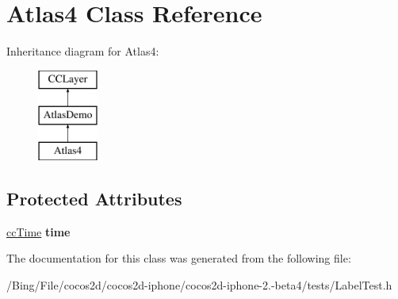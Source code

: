 \hypertarget{interface_atlas4}{\section{Atlas4 Class Reference}
\label{interface_atlas4}
}
Inheritance diagram for Atlas4\-:\begin{figure}[H]
\begin{center}
\leavevmode
\includegraphics[height=3.000000cm]{interface_atlas4}
\end{center}
\end{figure}
\subsection*{Protected Attributes}
\begin{DoxyCompactItemize}
\item 
\hypertarget{interface_atlas4_a39180d72f908f489700017f5afbe2dc7}{\hyperlink{cc_types_8h_ae6c674aac4bfb46a4e6cb1e89bb66b4f}{cc\-Time} {\bfseries time}}\label{interface_atlas4_a39180d72f908f489700017f5afbe2dc7}

\end{DoxyCompactItemize}


The documentation for this class was generated from the following file\-:\begin{DoxyCompactItemize}
\item 
/\-Bing/\-File/cocos2d/cocos2d-\/iphone/cocos2d-\/iphone-\/2.-\/beta4/tests/Label\-Test.\-h\end{DoxyCompactItemize}
